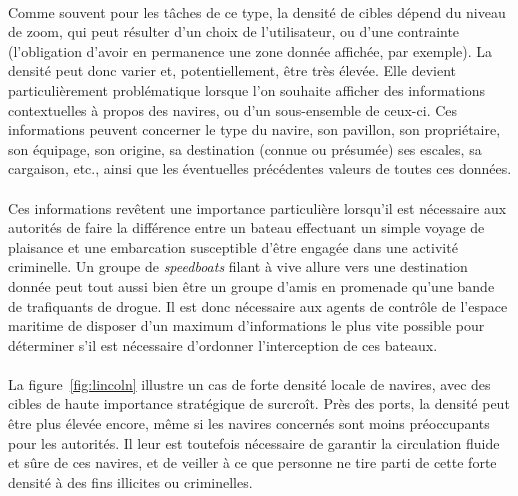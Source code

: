 	\paragraph*{}
	Comme souvent pour les tâches de ce type, la densité de cibles dépend du niveau de zoom, qui peut résulter d'un choix de l'utilisateur, ou d'une contrainte (l'obligation d'avoir en permanence une zone donnée affichée, par exemple). La densité peut donc varier et, potentiellement, être très élevée. Elle devient particulièrement problématique lorsque l'on souhaite afficher des informations contextuelles à propos des navires, ou d'un sous-ensemble de ceux-ci. Ces informations peuvent concerner le type du navire, son pavillon, son propriétaire, son équipage, son origine, sa destination (connue ou présumée) ses escales, sa cargaison, etc., ainsi que les éventuelles précédentes valeurs de toutes ces données.
	
	\paragraph*{}
	Ces informations revêtent une importance particulière lorsqu'il est nécessaire aux autorités de faire la différence entre un bateau effectuant un simple voyage de plaisance et une embarcation susceptible d'être engagée dans une activité criminelle. Un groupe de \emph{speedboats} filant à vive allure vers une destination donnée peut tout aussi bien être un groupe d'amis en promenade qu'une bande de trafiquants de drogue. Il est donc nécessaire aux agents de contrôle de l'espace maritime de disposer d'un maximum d'informations le plus vite possible pour déterminer s'il est nécessaire d'ordonner l'interception de ces bateaux.
	
	\paragraph*{}
	La figure~\ref{fig:lincoln} illustre un cas de forte densité locale de navires, avec des cibles de haute importance stratégique de surcroît. Près des ports, la densité peut être plus élevée encore, même si les navires concernés sont moins préoccupants pour les autorités. Il leur est toutefois nécessaire de garantir la circulation fluide et sûre de ces navires, et de veiller à ce que personne ne tire parti de cette forte densité à des fins illicites ou criminelles.
	
